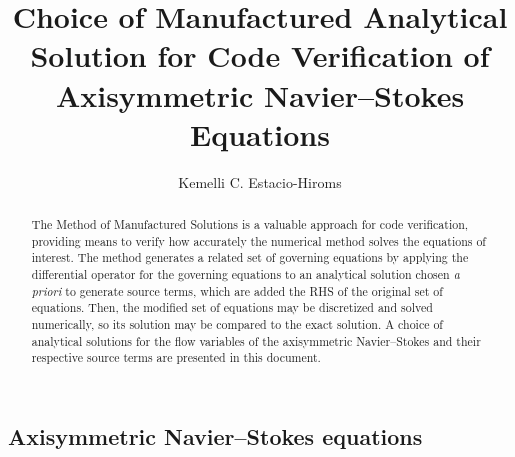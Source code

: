 \documentclass[a4paper,10pt]{article}
\title{Choice of Manufactured Analytical Solution for Code Verification of Axisymmetric Navier--Stokes Equations}
\author{Kemelli C. Estacio-Hiroms}
\begin{document}
\begin{landscape}
 
\maketitle

\begin{abstract}
The Method of Manufactured Solutions is a valuable approach for code verification, providing means to verify how accurately the numerical method solves the equations of interest. The method generates a related set of governing equations by applying the differential operator for the governing equations to an analytical solution chosen \textit{a priori} to generate source terms, which are added the RHS of the original set of equations. Then, the modified set of equations may be discretized and solved numerically, so its solution may be compared to the exact solution. A choice of analytical solutions for the flow variables of the axisymmetric Navier--Stokes and their respective source terms are presented in this document.
\end{abstract}

\section{Axisymmetric Navier--Stokes equations}


\end{landscape}
\end{document}
